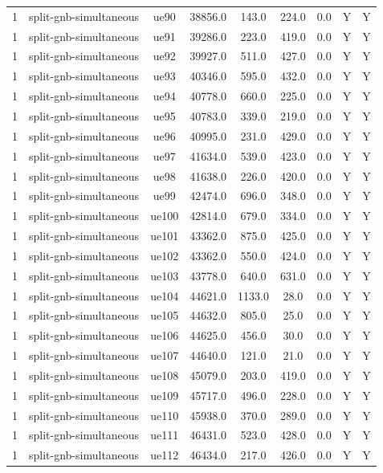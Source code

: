 \begin{table}[ht]
\begin{tabular}{|c|c|c|c|c|c|c|c|c|}
1 & split-gnb-simultaneous & ue90 & 38856.0 & 143.0 & 224.0 & 0.0 & Y & Y \\
1 & split-gnb-simultaneous & ue91 & 39286.0 & 223.0 & 419.0 & 0.0 & Y & Y \\
1 & split-gnb-simultaneous & ue92 & 39927.0 & 511.0 & 427.0 & 0.0 & Y & Y \\
1 & split-gnb-simultaneous & ue93 & 40346.0 & 595.0 & 432.0 & 0.0 & Y & Y \\
1 & split-gnb-simultaneous & ue94 & 40778.0 & 660.0 & 225.0 & 0.0 & Y & Y \\
1 & split-gnb-simultaneous & ue95 & 40783.0 & 339.0 & 219.0 & 0.0 & Y & Y \\
1 & split-gnb-simultaneous & ue96 & 40995.0 & 231.0 & 429.0 & 0.0 & Y & Y \\
1 & split-gnb-simultaneous & ue97 & 41634.0 & 539.0 & 423.0 & 0.0 & Y & Y \\
1 & split-gnb-simultaneous & ue98 & 41638.0 & 226.0 & 420.0 & 0.0 & Y & Y \\
1 & split-gnb-simultaneous & ue99 & 42474.0 & 696.0 & 348.0 & 0.0 & Y & Y \\
1 & split-gnb-simultaneous & ue100 & 42814.0 & 679.0 & 334.0 & 0.0 & Y & Y \\
1 & split-gnb-simultaneous & ue101 & 43362.0 & 875.0 & 425.0 & 0.0 & Y & Y \\
1 & split-gnb-simultaneous & ue102 & 43362.0 & 550.0 & 424.0 & 0.0 & Y & Y \\
1 & split-gnb-simultaneous & ue103 & 43778.0 & 640.0 & 631.0 & 0.0 & Y & Y \\
1 & split-gnb-simultaneous & ue104 & 44621.0 & 1133.0 & 28.0 & 0.0 & Y & Y \\
1 & split-gnb-simultaneous & ue105 & 44632.0 & 805.0 & 25.0 & 0.0 & Y & Y \\
1 & split-gnb-simultaneous & ue106 & 44625.0 & 456.0 & 30.0 & 0.0 & Y & Y \\
1 & split-gnb-simultaneous & ue107 & 44640.0 & 121.0 & 21.0 & 0.0 & Y & Y \\
1 & split-gnb-simultaneous & ue108 & 45079.0 & 203.0 & 419.0 & 0.0 & Y & Y \\
1 & split-gnb-simultaneous & ue109 & 45717.0 & 496.0 & 228.0 & 0.0 & Y & Y \\
1 & split-gnb-simultaneous & ue110 & 45938.0 & 370.0 & 289.0 & 0.0 & Y & Y \\
1 & split-gnb-simultaneous & ue111 & 46431.0 & 523.0 & 428.0 & 0.0 & Y & Y \\
1 & split-gnb-simultaneous & ue112 & 46434.0 & 217.0 & 426.0 & 0.0 & Y & Y \\

\end{tabular}
\end{table}
